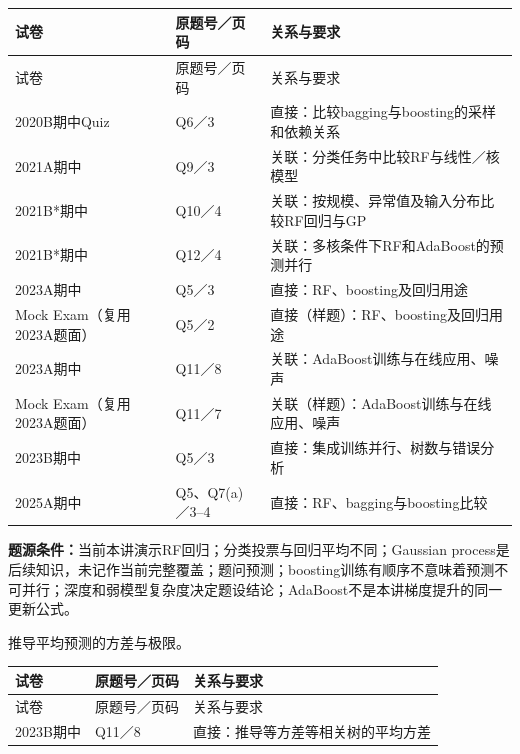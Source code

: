 \begingroup\small\setlength{\tabcolsep}{3pt}\renewcommand{\arraystretch}{1.22}
\begin{longtable}{@{}>{\raggedright\arraybackslash}p{}>{\raggedright\arraybackslash}p{}>{\raggedright\arraybackslash}p{}@{}}
\toprule
试卷 & 原题号／页码 & 关系与要求 \\
\midrule\endfirsthead
试卷 & 原题号／页码 & 关系与要求 \\
\midrule\endhead
\bottomrule\endfoot
2020B期中Quiz & Q6／3 & 直接：比较bagging与boosting的采样和依赖关系 \\
2021A期中 & Q9／3 & 关联：分类任务中比较RF与线性／核模型 \\
2021B*期中 & Q10／4 & 关联：按规模、异常值及输入分布比较RF回归与GP \\
2021B*期中 & Q12／4 & 关联：多核条件下RF和AdaBoost的预测并行 \\
2023A期中 & Q5／3 & 直接：RF、boosting及回归用途 \\
Mock Exam（复用2023A题面） & Q5／2 & 直接（样题）：RF、boosting及回归用途 \\
2023A期中 & Q11／8 & 关联：AdaBoost训练与在线应用、噪声 \\
Mock Exam（复用2023A题面） & Q11／7 & 关联（样题）：AdaBoost训练与在线应用、噪声 \\
2023B期中 & Q5／3 & 直接：集成训练并行、树数与错误分析 \\
2025A期中 & Q5、Q7(a)／3–4 & 直接：RF、bagging与boosting比较 \\
\end{longtable}\endgroup

\textbf{题源条件：}当前本讲演示RF回归；分类投票与回归平均不同；Gaussian process是后续知识，未记作当前完整覆盖；题问预测；boosting训练有顺序不意味着预测不可并行；深度和弱模型复杂度决定题设结论；AdaBoost不是本讲梯度提升的同一更新公式。



推导平均预测的方差与极限。

\begingroup\small\setlength{\tabcolsep}{3pt}\renewcommand{\arraystretch}{1.22}
\begin{longtable}{@{}>{\raggedright\arraybackslash}p{}>{\raggedright\arraybackslash}p{}>{\raggedright\arraybackslash}p{}@{}}
\toprule
试卷 & 原题号／页码 & 关系与要求 \\
\midrule\endfirsthead
试卷 & 原题号／页码 & 关系与要求 \\
\midrule\endhead
\bottomrule\endfoot
2023B期中 & Q11／8 & 直接：推导等方差等相关树的平均方差 \\
\end{longtable}\endgroup

